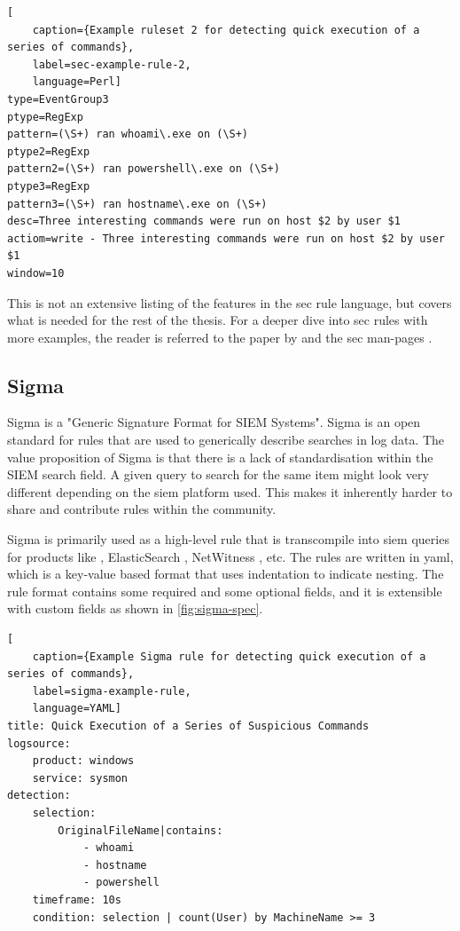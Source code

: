 \begin{lstlisting}[
    caption={Example ruleset 2 for detecting quick execution of a series of commands},
    label=sec-example-rule-2,
    language=Perl]
type=EventGroup3
ptype=RegExp
pattern=(\S+) ran whoami\.exe on (\S+)
ptype2=RegExp
pattern2=(\S+) ran powershell\.exe on (\S+)
ptype3=RegExp
pattern3=(\S+) ran hostname\.exe on (\S+)
desc=Three interesting commands were run on host $2 by user $1
actiom=write - Three interesting commands were run on host $2 by user $1
window=10
\end{lstlisting}

This is not an extensive listing of the features in the \acrshort{sec} rule language, but covers what is needed for the rest of the thesis. For a deeper dive into \acrshort{sec} rules with more examples, the reader is referred to the paper  by \textcite{rouillard2004real} and the \acrshort{sec} man-pages \cite{secman}.

\subsection{Sigma}
\label{sub:sigma}
Sigma is a "Generic Signature Format for SIEM Systems"\cite{Sigma}. Sigma is an open standard for rules that are used to generically describe searches in log data. The value proposition of Sigma is that there is a lack of standardisation within the SIEM search field. A given query to search for the same item might look very different depending on the \acrshort{siem} platform used. This makes it inherently harder to share and contribute rules within the community. 

Sigma is primarily used as a high-level rule that is transcompile into \acrshort{siem} queries for products like \textcite{Splunk}, ElasticSearch \cite{ElasticS68:online}, NetWitness \cite{NetWitness}, etc. The rules are written in \acrfull{yaml}\cite{yaml}, which is a key-value based format that uses indentation to indicate nesting. The rule format contains some required and some optional fields, and it is extensible with custom fields as shown in \cref{fig:sigma-spec}.

\begin{lstlisting}[
    caption={Example Sigma rule for detecting quick execution of a series of commands},
    label=sigma-example-rule,
    language=YAML]
title: Quick Execution of a Series of Suspicious Commands
logsource:
    product: windows
    service: sysmon
detection:
    selection:
        OriginalFileName|contains:
            - whoami
            - hostname
            - powershell
    timeframe: 10s
    condition: selection | count(User) by MachineName >= 3
\end{lstlisting}

